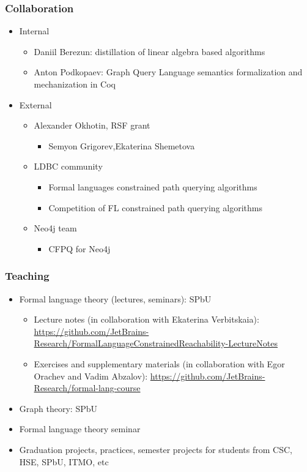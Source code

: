 \documentclass[xcolor=table]{beamer}
\begin{document}
\begin{frame}[fragile]

  \frametitle{Collaboration}
\begin{itemize}
      \item Internal
      \begin{itemize}
        \item Daniil Berezun: distillation of linear algebra based algorithms
        \item Anton Podkopaev: Graph Query Language semantics formalization and mechanization in Coq
      \end{itemize}
      \item External
      \begin{itemize}
      \item Alexander Okhotin, RSF grant 
      \begin{itemize}
        \item Semyon Grigorev,Ekaterina Shemetova
      \end{itemize}
      \item LDBC community
      \begin{itemize}
        \item Formal languages constrained path querying algorithms
        \item Competition of FL constrained path querying algorithms 
      \end{itemize}
      \item Neo4j team
      \begin{itemize}
        \item CFPQ for Neo4j
      \end{itemize}
    \end{itemize}

\end{itemize}
\end{frame}

\begin{frame}[fragile]

  \frametitle{Teaching}
\begin{itemize}
      \item Formal language theory (lectures, seminars): SPbU
        \begin{itemize}
          \item [\faGears] Lecture notes (in collaboration with Ekaterina Verbitskaia): \url{https://github.com/JetBrains-Research/FormalLanguageConstrainedReachability-LectureNotes} 
          \item [\faGears] Exercises and supplementary materials (in collaboration with Egor Orachev and Vadim Abzalov): \url{https://github.com/JetBrains-Research/formal-lang-course}
        \end{itemize}
      \item Graph theory: SPbU
      \item Formal language theory seminar
      \item Graduation projects, practices, semester projects for students from CSC, HSE, SPbU, ITMO, etc
\end{itemize}
\end{frame}
\end{document}
